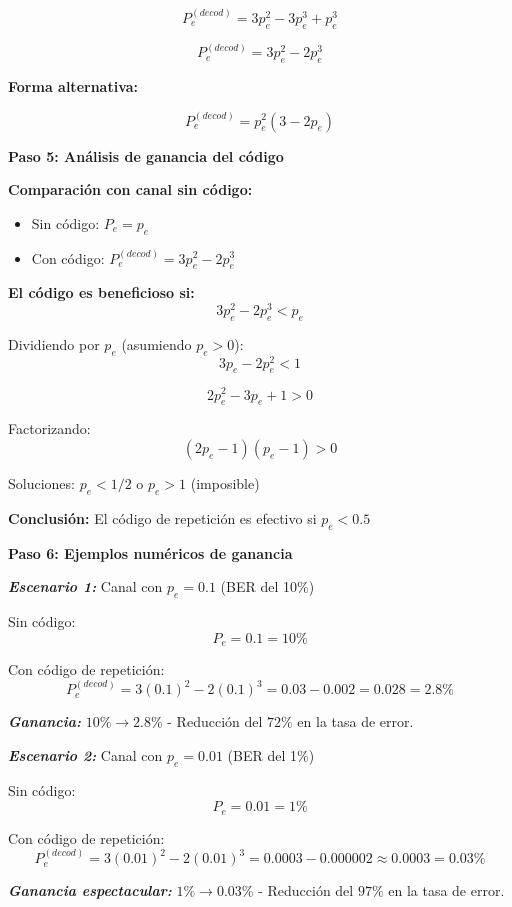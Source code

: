 \documentclass[11pt,a4paper]{article}
\begin{document}
\[
P_e^{(decod)} = 3p_e^2 - 3p_e^3 + p_e^3
\]

\[
\boxed{P_e^{(decod)} = 3p_e^2 - 2p_e^3}
\]

\textbf{Forma alternativa:}

\[
P_e^{(decod)} = p_e^2(3 - 2p_e)
\]

\textbf{Paso 5: An\'alisis de ganancia del c\'odigo}

\textbf{Comparaci\'on con canal sin c\'odigo:}

\begin{itemize}
    \item Sin c\'odigo: $P_e = p_e$
    \item Con c\'odigo: $P_e^{(decod)} = 3p_e^2 - 2p_e^3$
\end{itemize}

\textbf{El c\'odigo es beneficioso si:}
\[
3p_e^2 - 2p_e^3 < p_e
\]

Dividiendo por $p_e$ (asumiendo $p_e > 0$):
\[
3p_e - 2p_e^2 < 1
\]

\[
2p_e^2 - 3p_e + 1 > 0
\]

Factorizando:
\[
(2p_e - 1)(p_e - 1) > 0
\]

Soluciones: $p_e < 1/2$ o $p_e > 1$ (imposible)

\textbf{Conclusi\'on:} El c\'odigo de repetici\'on es efectivo si $\boxed{p_e < 0.5}$

\textbf{Paso 6: Ejemplos num\'ericos de ganancia}

\textit{\textbf{Escenario 1:}} Canal con $p_e = 0.1$ (BER del 10\%)

Sin c\'odigo:
\[
P_e = 0.1 = 10\%
\]

Con c\'odigo de repetici\'on:
\[
P_e^{(decod)} = 3(0.1)^2 - 2(0.1)^3 = 0.03 - 0.002 = 0.028 = 2.8\%
\]

\textit{\textbf{Ganancia:}} $10\% \to 2.8\%$ - Reducci\'on del $72\%$ en la tasa de error.

\vspace{0.2cm}

\textit{\textbf{Escenario 2:}} Canal con $p_e = 0.01$ (BER del 1\%)

Sin c\'odigo:
\[
P_e = 0.01 = 1\%
\]

Con c\'odigo de repetici\'on:
\[
P_e^{(decod)} = 3(0.01)^2 - 2(0.01)^3 = 0.0003 - 0.000002 \approx 0.0003 = 0.03\%
\]

\textit{\textbf{Ganancia espectacular:}} $1\% \to 0.03\%$ - Reducci\'on del $97\%$ en la tasa de error.

\vspace{0.2cm}
\end{document}
